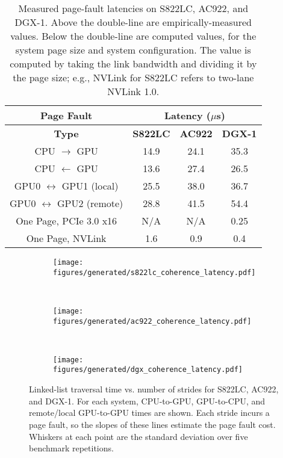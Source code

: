 \begin{table}[ht]
	\centering
	\caption[Page fault latencies]{
        Measured page-fault latencies on S822LC, AC922, and DGX-1.
        Above the double-line are empirically-measured values.
        Below the double-line are computed values, for the system page size and system configuration.
        The value is computed by taking the link bandwidth and dividing it by the page size; e.g., NVLink for S822LC refers to two-lane NVLink 1.0.
    }
	\label{tab:page-fault-latency}
	\begin{tabular}{cccc}
        \hline
        \textbf{Page Fault}                  & \multicolumn{3}{c|}{\textbf{Latency ($\mu$s)}}    \\ \hline
		\textbf{Type}                        & \textbf{S822LC} & \textbf{AC922} & \textbf{DGX-1} \\ \hline
		CPU  $\rightarrow$ GPU               & 14.9            & 24.1           & 35.3           \\ \hline
		CPU  $\leftarrow$  GPU               & 13.6            & 27.4           & 26.5           \\ \hline
		GPU0 $\leftrightarrow$ GPU1 (local)  & 25.5            & 38.0           & 36.7           \\ \hline
        GPU0 $\leftrightarrow$ GPU2 (remote) & 28.8            & 41.5           & 54.4           \\ \hline
        \hline
        One Page, PCIe 3.0 x16               & N/A             & N/A            & 0.25           \\ \hline
        One Page, NVLink                     & 1.6             & 0.9            & 0.4            \\ \hline
	\end{tabular}
\end{table}


\begin{figure}[ht]
	\centering
	\begin{subfigure}[b]{0.31\textwidth}
		\texttt{[image: figures/generated/s822lc\_coherence\_latency.pdf]}
		\caption{}
		\label{fig:s822lc-page-fault}
	\end{subfigure}
	~
	\begin{subfigure}[b]{0.31\textwidth}
		\texttt{[image: figures/generated/ac922\_coherence\_latency.pdf]}
		\caption{}
		\label{fig:ac922-page-fault}
	\end{subfigure}
	~
	\begin{subfigure}[b]{0.31\textwidth}
		\texttt{[image: figures/generated/dgx\_coherence\_latency.pdf]}
		\caption{}
		\label{fig:dgx-page-fault}
	\end{subfigure}
	\caption[Page fault latencies for S822LC, AC922, and DGX-1]{
        Linked-list traversal time vs. number of strides for S822LC, AC922, and DGX-1.
        For each system, CPU-to-GPU, GPU-to-CPU, and remote/local GPU-to-GPU times are shown.
        Each stride incurs a page fault, so the slopes of these lines estimate the page fault cost.
		Whiskers at each point are the standard deviation over five benchmark repetitions.
    }
	\label{fig:coherence-page-fault-latency}
\end{figure}

